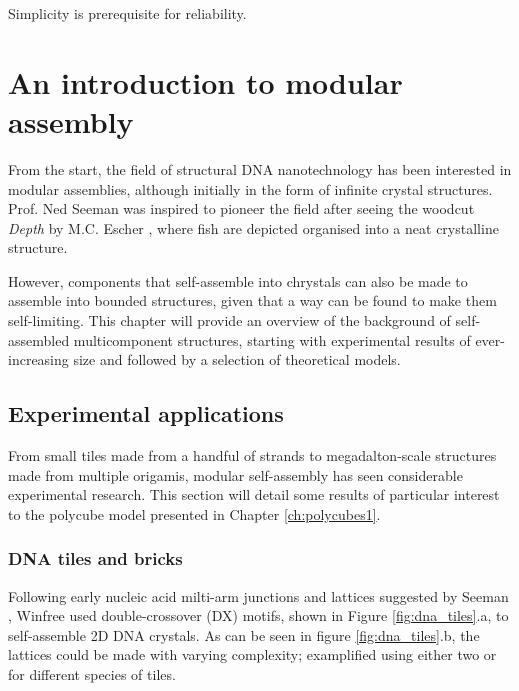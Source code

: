 \begin{savequote}[8cm]
Simplicity is prerequisite for reliability.
\end{savequote}

\chapter{\label{ch:polycubes_intro}An introduction to modular assembly}

\minitoc

From the start, the field of structural DNA nanotechnology has been interested in modular assemblies, although initially in the form of infinite crystal structures. Prof. Ned Seeman was inspired to pioneer the field after seeing the woodcut \emph{Depth} by M.C. Escher \cite{seeman_2016}, where fish are depicted organised into a neat crystalline structure.

However, components that self-assemble into chrystals can also be made to assemble into bounded structures, given that a way can be found to make them self-limiting. This chapter will provide an overview of the background of self-assembled multicomponent structures, starting with experimental results of ever-increasing size and followed by a selection of theoretical models.

\section{Experimental applications} \label{sec:experimental_appl}
From small tiles made from a handful of strands to megadalton-scale structures made from multiple origamis, modular self-assembly has seen considerable experimental research. This section will detail some results of particular interest to the polycube model presented in Chapter \ref{ch:polycubes1}.

\subsection{DNA tiles and bricks}
\label{sec:dna_tiles_bricks}
Following early nucleic acid milti-arm junctions and lattices suggested by Seeman \cite{seeman1982nucleic}, Winfree \cite{winfree1998design} used double-crossover (DX) motifs, shown in Figure \ref{fig:dna_tiles}.a, to self-assemble 2D DNA crystals. As can be seen in figure \ref{fig:dna_tiles}.b, the lattices could be made with varying complexity; examplified using either two or for different species of tiles.

